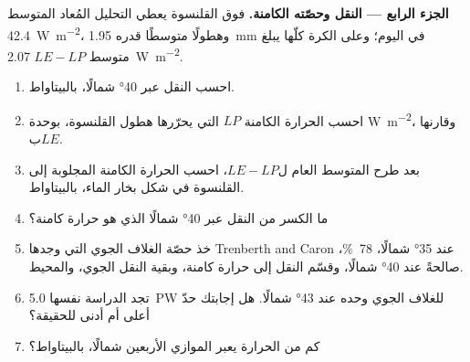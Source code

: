 \begin{problem}
\medskip
\noindent\textbf{الجزء الرابع --- النقل وحصّته الكامنة.} فوق القلنسوة يعطي التحليل المُعاد  المتوسط \qty{42.4}{W.m^{-2}}، وهطولًا متوسطًا قدره \qty{1.95}{mm} في اليوم؛ وعلى الكرة كلّها يبلغ متوسط $LE - LP$
\qty{2.07}{W.m^{-2}}.
\begin{enumerate}[resume]
  \item احسب النقل عبر \ang{40} شمالًا، بالبيتاواط.
  \item احسب الحرارة الكامنة $LP$ التي يحرّرها هطول القلنسوة، بوحدة \unit{W.m^{-2}}، وقارنها ب$LE$.
  \item بعد طرح المتوسط العام ل$LE - LP$، احسب الحرارة الكامنة المجلوبة إلى القلنسوة في شكل بخار الماء، بالبيتاواط.
  \item ما الكسر من النقل عبر \ang{40} شمالًا الذي هو حرارة كامنة؟
  \item خذ حصّة الغلاف الجوي التي وجدها Trenberth and Caron عند \ang{35} شمالًا، \qty{78}{\percent}، صالحةً عند \ang{40} شمالًا، وقسّم النقل إلى حرارة كامنة، وبقية النقل الجوي، والمحيط.
  \item تجد الدراسة نفسها \qty{5.0}{PW} للغلاف الجوي وحده عند \ang{43} شمالًا. هل إجابتك حدّ أعلى أم أدنى للحقيقة؟
  \item كم من الحرارة يعبر الموازي الأربعين شمالًا، بالبيتاواط؟
\end{enumerate}
\end{problem}
